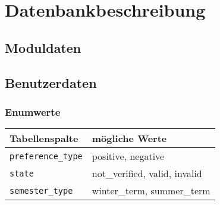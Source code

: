 \newpage
\section{Datenbankbeschreibung}

\subsection{Moduldaten}

\subsection{Benutzerdaten}

\subsubsection{Enumwerte}
\begin{tabular}{|l|l|}
	\hline
	\textbf{Tabellenspalte} & \textbf{mögliche Werte} \\ \hline
	\texttt{preference\_type} & positive, negative \\ \hline
	\texttt{state} & not\_verified, valid, invalid \\ \hline
	\texttt{semester\_type} & winter\_term, summer\_term \\ \hline
\end{tabular}